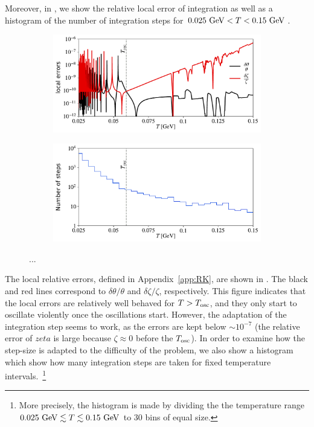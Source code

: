 \documentclass[11pt,a4paper]{article}
\begin{document}
%
Moreover, in , we show the relative local error of integration as well as a histogram of the number of integration steps for $0.025~{\rm GeV} < T < 0.15 ~{\rm GeV}$.
%
\begin{figure}[h]
	\begin{subfigure}[]{0.5\textwidth}
		\includegraphics[width=1\textwidth]{figs/local_errors-EMD.pdf}
		\caption{}
		\label{fig:local_errors-EMD}
	\end{subfigure}
	\begin{subfigure}[]{0.5\textwidth}
		\includegraphics[width=1\textwidth]{figs/histogram-EMD.pdf}
		\caption{}
		\label{fig:histogram-EMD}
	\end{subfigure}
	\caption{...}
	\label{fig:RK_response}
\end{figure}
%
The local relative errors, defined in Appendix~\ref{app:RK}, are shown in . The black and red lines correspond to $\delta \theta/\theta$ and $\delta \zeta/\zeta$, respectively. This figure indicates that the local errors are relatively well behaved for $T>T_{\rm osc}{}$, and they only start to oscillate violently once the oscillations start. However, the adaptation of the integration step seems to work, as the errors are kept below $\sim 10^{-7}$ (the relative error of $zeta$ is large because $\zeta \approx 0$ before the $T_{\rm osc}{}$).  In order to examine how the step-size is adapted to the difficulty of the problem, we also show a histogram which show how many integration steps are taken for fixed temperature intervals.~\footnote{More precisely, the histogram is made by dividing the the temperature range $0.025~{\rm GeV}\lesssim T\lesssim 0.15~{\rm GeV}$ to $30$ bins of equal size.} 
\end{document}
